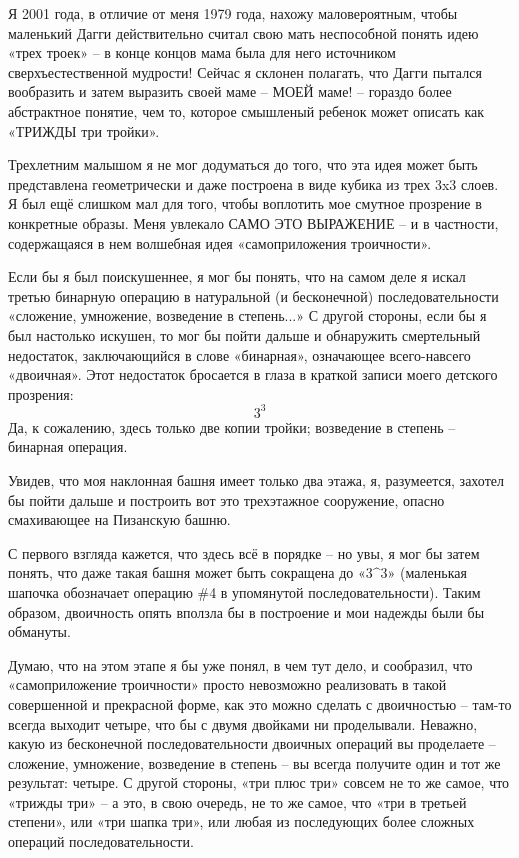 \documentclass[../main.tex]{subfiles}
\begin{document}
Я 2001 года, в отличие от меня 1979 года, нахожу маловероятным, чтобы маленький Дагги действительно считал свою мать неспособной понять идею «трех троек» \--- в конце концов мама была для него источником сверхъестественной мудрости! Сейчас я склонен полагать, что Дагги пытался вообразить и затем выразить своей маме \--- МОЕЙ маме! \--- гораздо более абстрактное понятие, чем то, которое смышленый ребенок может описать как «ТРИЖДЫ три тройки».

Трехлетним малышом я не мог додуматься до того, что эта идея может быть представлена геометрически и даже построена в виде кубика из трех 3x3 слоев. Я был ещё слишком мал для того, чтобы воплотить мое смутное прозрение в конкретные образы. Меня увлекало САМО ЭТО ВЫРАЖЕНИЕ \--- и в частности, содержащаяся в нем волшебная идея «самоприложения троичности».

Если бы я был поискушеннее, я мог бы понять, что на самом деле я искал третью бинарную операцию в натуральной (и бесконечной) последовательности «сложение, умножение, возведение в степень...» С другой стороны, если бы я был настолько искушен, то мог бы пойти дальше и обнаружить смертельный недостаток, заключающийся в слове «бинарная», означающее всего-навсего «двоичная». Этот недостаток бросается в глаза в краткой записи моего детского прозрения:
\[
    3^3
\]
Да, к сожалению, здесь только две копии тройки; возведение в степень \--- бинарная операция.

Увидев, что моя наклонная башня имеет только два этажа, я, разумеется, захотел бы пойти дальше и построить вот это трехэтажное сооружение, опасно смахивающее на Пизанскую башню.

С первого взгляда кажется, что здесь всё в порядке \--- но увы, я мог бы затем понять, что даже такая башня может быть сокращена до «$3 \text{\textasciicircum} 3$» (маленькая шапочка обозначает операцию \#4 в упомянутой последовательности). Таким образом, двоичность опять вползла бы в построение и мои надежды были бы обмануты.

Думаю, что на этом этапе я бы уже понял, в чем тут дело, и сообразил, что «самоприложение троичности» просто невозможно реализовать в такой совершенной и прекрасной форме, как это можно сделать с двоичностью \--- там-то всегда выходит четыре, что бы с двумя двойками ни проделывали. Неважно, какую из бесконечной последовательности двоичных операций вы проделаете \--- сложение, умножение, возведение в степень \--- вы всегда получите один и тот же результат: четыре. С другой стороны, «три плюс три» совсем не то же самое, что «трижды три» \--- а это, в свою очередь, не то же самое, что «три в третьей степени», или «три шапка три», или любая из последующих более сложных операций последовательности.
\end{document}

